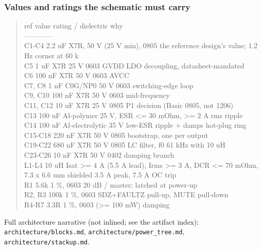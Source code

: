 \documentclass[11pt]{article}
\begin{document}
\subsubsection*{Values and ratings the schematic must carry}
\begin{quote}\small\ttfamily\raggedright
\textbar{} ref \textbar{} value \textbar{} rating / dielectric \textbar{} why \textbar{}\\
\textbar{}---\textbar{}---\textbar{}---\textbar{}---\textbar{}\\
\textbar{} C1-C4 \textbar{} 2.2 uF \textbar{} X7R, 50 V (25 V min), 0805 \textbar{} the reference design's value; 1.2 Hz corner at 60 k \textbar{}\\
\textbar{} C5 \textbar{} 1 uF \textbar{} X7R 25 V 0603 \textbar{} GVDD LDO decoupling, datasheet-mandated \textbar{}\\
\textbar{} C6 \textbar{} 100 nF \textbar{} X7R 50 V 0603 \textbar{} AVCC \textbar{}\\
\textbar{} C7, C8 \textbar{} 1 nF \textbar{} C0G/NP0 50 V 0603 \textbar{} switching-edge loop \textbar{}\\
\textbar{} C9, C10 \textbar{} 100 nF \textbar{} X7R 50 V 0603 \textbar{} mid-frequency \textbar{}\\
\textbar{} C11, C12 \textbar{} 10 uF \textbar{} X7R 25 V 0805 \textbar{} P1 decision (Basic 0805, not 1206) \textbar{}\\
\textbar{} C13 \textbar{} 100 uF \textbar{} Al-polymer 25 V, ESR \textless{}= 30 mOhm, \textgreater{}= 2 A rms \textbar{} ripple \textbar{}\\
\textbar{} C14 \textbar{} 100 uF \textbar{} Al-electrolytic 35 V low-ESR \textbar{} ripple + damps hot-plug ring \textbar{}\\
\textbar{} C15-C18 \textbar{} 220 nF \textbar{} X7R 50 V 0805 \textbar{} bootstrap, one per output \textbar{}\\
\textbar{} C19-C22 \textbar{} 680 nF \textbar{} X7R 50 V 0805 \textbar{} LC filter, f0 61 kHz with 10 uH \textbar{}\\
\textbar{} C23-C26 \textbar{} 10 nF \textbar{} X7R 50 V 0402 \textbar{} damping branch \textbar{}\\
\textbar{} L1-L4 \textbar{} 10 uH \textbar{} Isat \textgreater{}= 4 A (5.5 A lead), Irms \textgreater{}= 3 A, DCR \textless{}= 70 mOhm, 7.3 x 6.6 mm shielded \textbar{} 3.5 A peak, 7.5 A OC trip \textbar{}\\
\textbar{} R1 \textbar{} 5.6k \textbar{} 1 \%, 0603 \textbar{} 20 dB / master; latched at power-up \textbar{}\\
\textbar{} R2, R3 \textbar{} 100k \textbar{} 1 \%, 0603 \textbar{} SDZ+FAULTZ pull-up, MUTE pull-down \textbar{}\\
\textbar{} R4-R7 \textbar{} 3.3R \textbar{} 1 \%, 0603 (\textgreater{}= 100 mW) \textbar{} damping \textbar{}
\end{quote}
Full architecture narrative (not inlined; see the artifact index): \texttt{architecture/blocks.md}, \texttt{architecture/power\_tree.md}, \texttt{architecture/stackup.md}.
\end{document}
